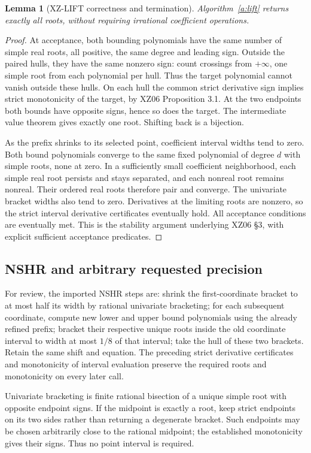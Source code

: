 \documentclass[11pt]{article}
\newtheorem{lemma}[theorem]{Lemma}
\theoremstyle{definition}
\begin{document}
\begin{lemma}[XZ-LIFT correctness and termination]\label{l:lift}
Algorithm~\ref{a:lift} returns exactly all roots, without requiring irrational
coefficient operations.
\end{lemma}
\begin{proof}
At acceptance, both bounding polynomials have the same number of simple real
roots, all positive, the same degree and leading sign. Outside the paired hulls,
they have the same nonzero sign: count crossings from $+\infty$, one simple root
from each polynomial per hull. Thus the target polynomial cannot vanish outside
these hulls. On each hull the common strict derivative sign implies strict
monotonicity of the target, by XZ06 Proposition 3.1. At the two endpoints both
bounds have opposite signs, hence so does the target. The intermediate value
theorem gives exactly one root. Shifting back is a bijection.

As the prefix shrinks to its selected point, coefficient interval widths tend
to zero. Both bound polynomials converge to the same fixed polynomial of degree
$d$ with simple roots, none at zero. In a sufficiently small coefficient
neighborhood, each simple real root persists and stays separated, and each
nonreal root remains nonreal. Their ordered real roots therefore pair and converge.
The univariate bracket widths also tend to zero. Derivatives at the limiting roots
are nonzero, so the strict interval derivative certificates eventually hold.
All acceptance conditions are eventually met. This is the stability argument
underlying XZ06 \S3, with explicit sufficient acceptance predicates.
\end{proof}

\subsection{NSHR and arbitrary requested precision}
For review, the imported NSHR steps are: shrink the first-coordinate bracket to
at most half its width by rational univariate bracketing; for each subsequent
coordinate, compute new lower and upper bound polynomials using the already
refined prefix; bracket their respective unique roots inside the old coordinate
interval to width at most $1/8$ of that interval; take the hull of these two
brackets. Retain the same shift and equation. The preceding strict derivative
certificates and monotonicity of interval evaluation preserve the required roots
and monotonicity on every later call.

Univariate bracketing is finite rational bisection of a unique simple root with
opposite endpoint signs. If the midpoint is exactly a root, keep strict endpoints
on its two sides rather than returning a degenerate bracket. Such endpoints may
be chosen arbitrarily close to the rational midpoint; the established
monotonicity gives their signs. Thus no point interval is required.
\end{document}
